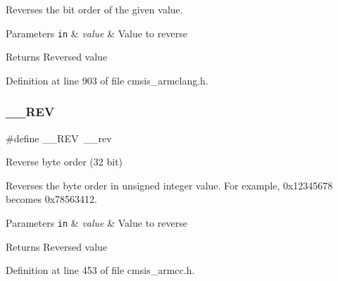 Reverses the bit order of the given value. 
\begin{DoxyParams}[1]{Parameters}
\mbox{\tt in}  & {\em value} & Value to reverse \\
\hline
\end{DoxyParams}
\begin{DoxyReturn}{Returns}
Reversed value 
\end{DoxyReturn}


Definition at line 903 of file cmsis\+\_\+armclang.\+h.

\mbox{\label{group___c_m_s_i_s___core___instruction_interface_ga14f54807872c0f5e05604c4924abfdae}} 
\subsubsection{\texorpdfstring{\+\_\+\+\_\+\+R\+EV}{\_\_REV}\hspace{0.1cm}{\footnotesize\ttfamily [1/2]}}
{\footnotesize\ttfamily \#define \+\_\+\+\_\+\+R\+EV~\+\_\+\+\_\+rev}



Reverse byte order (32 bit) 

Reverses the byte order in unsigned integer value. For example, 0x12345678 becomes 0x78563412. 
\begin{DoxyParams}[1]{Parameters}
\mbox{\tt in}  & {\em value} & Value to reverse \\
\hline
\end{DoxyParams}
\begin{DoxyReturn}{Returns}
Reversed value 
\end{DoxyReturn}


Definition at line 453 of file cmsis\+\_\+armcc.\+h.

\mbox{\label{group___c_m_s_i_s___core___instruction_interface_gaca25a02e09983da5558f5242f2f635bc}} 
